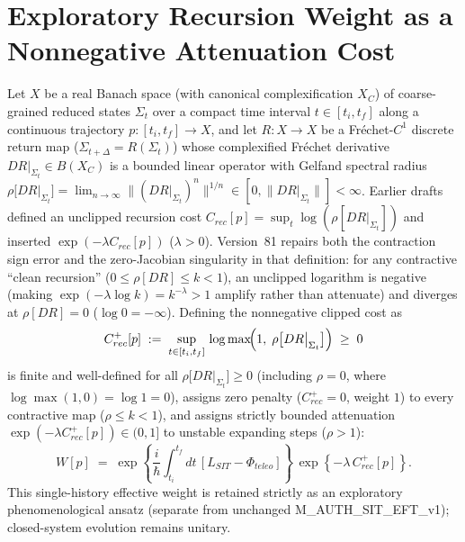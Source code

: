 \documentclass[american,11pt,letterpaper]{article}
\def\mathbb#1{#1}%
\def\mathcal#1{#1}%
\def\mathrm#1{#1}%
\def\texttt#1{#1}%
\begin{document}
\section{Exploratory Recursion Weight as a Nonnegative Attenuation Cost}
\label{sec:recursion-influence}
\label{app:recursion-influence}
Let $X$ be a real Banach space (with canonical complexification $X_{\mathbb{C}}$) of coarse-grained reduced states $\Sigma_t$ over a compact time interval $t \in [t_i, t_f]$ along a continuous trajectory $p : [t_i, t_f] \to X$, and let $\mathcal{R} : X \to X$ be a Fr\'echet-$C^1$ discrete return map ($\Sigma_{t+\Delta}=\mathcal{R}(\Sigma_t)$) whose complexified Fr\'echet derivative $D\mathcal{R}|_{\Sigma_t} \in \mathcal{B}(X_{\mathbb{C}})$ is a bounded linear operator with Gelfand spectral radius $\rho\bigl[D\mathcal{R}|_{\Sigma_t}\bigr] = \lim_{n\to\infty}\|(D\mathcal{R}|_{\Sigma_t})^n\|^{1/n} \in [0, \|D\mathcal{R}|_{\Sigma_t}\|] < \infty$. Earlier drafts defined an unclipped recursion cost $C_{\mathrm{rec}}[p] = \sup_t \log(\rho[D\mathcal{R}|_{\Sigma_t}])$ and inserted $\exp(-\lambda C_{\mathrm{rec}}[p])$ ($\lambda > 0$). Version~81 repairs both the contraction sign error and the zero-Jacobian singularity in that definition: for any contractive ``clean recursion'' ($0 \le \rho[D\mathcal{R}] \le k < 1$), an unclipped logarithm is negative (making $\exp(-\lambda\log k) = k^{-\lambda} > 1$ amplify rather than attenuate) and diverges at $\rho[D\mathcal{R}] = 0$ ($\log 0 = -\infty$). Defining the nonnegative clipped cost as
\begin{equation}
C_{\mathrm{rec}}^+[p] \;:=\; \sup_{t \in [t_i, t_f]}\,\log\max\!\Bigl(1,\;\rho\bigl[D\mathcal{R}\big|_{\Sigma_t}\bigr]\Bigr) \;\ge\; 0
\label{eq:nonneg_recursion_cost}
\end{equation}
is finite and well-defined for all $\rho\bigl[D\mathcal{R}|_{\Sigma_t}\bigr] \ge 0$ (including $\rho = 0$, where $\log\max(1, 0) = \log 1 = 0$), assigns zero penalty ($C_{\mathrm{rec}}^+ = 0$, weight $1$) to every contractive map ($\rho \le k < 1$), and assigns strictly bounded attenuation $\exp(-\lambda C_{\mathrm{rec}}^+[p]) \in (0, 1]$ to unstable expanding steps ($\rho > 1$):
\[
\mathcal{W}[p] \;=\; \exp\!\left\{\frac{i}{\hbar}\!\int_{t_i}^{t_f}\!dt\,[\mathcal{L}_{\mathrm{SIT}}-\Phi_{\mathrm{teleo}}]\right\}\,
\exp\!\left\{-\lambda\,C_{\mathrm{rec}}^+[p]\right\}.
\]
This single-history effective weight is retained strictly as an exploratory phenomenological ansatz (separate from unchanged \texttt{M\_AUTH\_SIT\_EFT\_v1}); closed-system evolution remains unitary.
\end{document}
